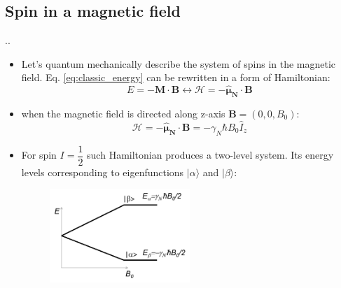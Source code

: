 \documentclass{beamer}
\begin{document}
\subsection{Spin in a magnetic field}
\begin{frame}{\thesection.\thesubsection. \insertsubsection}
		\begin{itemize}[<+>]
		\item Let's quantum mechanically describe the system of spins in the magnetic field. Eq. \ref{eq:classic_energy} can be rewritten in a form of Hamiltonian:
		\begin{equation}
			E = -\bm{M} \cdot \bm{B}  \longleftrightarrow \mathcal{H}= - \bm{\hat{\mu}_N} \cdot \bm{B} 
		\end{equation}
		\item when the magnetic field is directed along z-axis $\bm{B}= (0,0,B_0)$:
		\begin{equation}
		\mathcal{H}= - \bm{\hat{\mu}_N} \cdot \bm{B} = -\gamma_N \hbar B_0 \hat{I}_z
		\end{equation}
		\item For spin $I=\dfrac{1}{2}$ such Hamiltonian produces a two-level system. Its energy levels corresponding to eigenfunctions $\vert \alpha \rangle$ and $\vert \beta \rangle$:
		\begin{figure}
		    \includegraphics[width=0.5\textwidth]{two-level_system.png}
		\end{figure}
		
	\end{itemize}
\end{frame}
\end{document}
